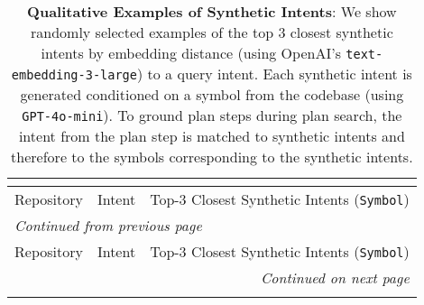 \begin{longtable}{p{3cm}p{6cm}p{6cm}}
\caption{\textbf{Qualitative Examples of Synthetic Intents}: We show randomly selected examples of the top 3 closest synthetic intents by embedding distance (using OpenAI's \texttt{text-embedding-3-large}) to a query intent. Each synthetic intent is generated conditioned on a symbol from the codebase (using \texttt{GPT-4o-mini}). To ground plan steps during plan search, the intent from the plan step is matched to synthetic intents and therefore to the symbols corresponding to the synthetic intents.} \\
\label{tab:synthetic-intents-example} \\
\toprule
Repository & Intent & Top-3 Closest Synthetic Intents (\texttt{Symbol}) \\
\midrule
\endfirsthead

\multicolumn{3}{l}{\emph{Continued from previous page}} \\
\toprule
Repository & Intent & Top-3 Closest Synthetic Intents (\texttt{Symbol}) \\
\midrule
\endhead

\midrule
\multicolumn{3}{r}{\emph{Continued on next page}} \\
\endfoot

\bottomrule
\endlastfoot


\end{longtable}
